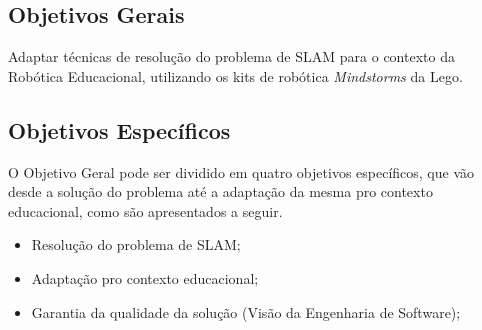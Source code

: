 	\subsection{Objetivos Gerais} %
	\label{sub:objetivos_gerais}
	
		Adaptar técnicas de resolução do problema de SLAM para o contexto da Robótica Educacional, utilizando os kits de robótica \textit{Mindstorms} da Lego.


	\subsection{Objetivos Específicos} %
	\label{sub:objetivos_específicos}

		O Objetivo Geral pode ser dividido em quatro objetivos específicos, que vão desde a solução do problema até a adaptação da mesma pro contexto educacional, como são apresentados a seguir.
		 
	\begin{itemize}
		\item Resolução do problema de SLAM;
		\item Adaptação pro contexto educacional;
		\item Garantia da qualidade da solução (Visão da Engenharia de Software); 
	\end{itemize}
	
